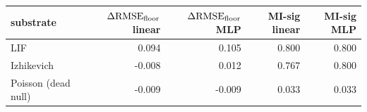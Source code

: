 \begin{tabular}{lrrrr}
\toprule
substrate & $\Delta\mathrm{RMSE}_{\mathrm{floor}}$ linear & $\Delta\mathrm{RMSE}_{\mathrm{floor}}$ MLP & MI-sig linear & MI-sig MLP \\
\midrule
LIF & 0.094 & 0.105 & 0.800 & 0.800 \\
Izhikevich & -0.008 & 0.012 & 0.767 & 0.800 \\
Poisson (dead null) & -0.009 & -0.009 & 0.033 & 0.033 \\
\bottomrule
\end{tabular}
